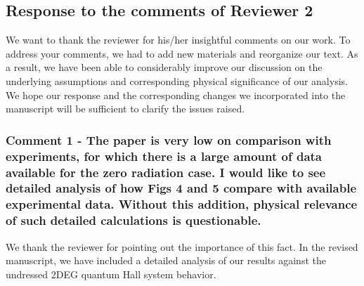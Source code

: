 \documentclass{article}
\begin{document}
\subsection*{Response to the comments of Reviewer 2}

We want to thank the reviewer for his/her insightful comments on our work. To address your comments, we had to add new materials and reorganize our text. As a result, we have been able to considerably improve our discussion on the underlying assumptions and corresponding physical significance of our analysis. We hope our response and the corresponding changes we incorporated into the manuscript will be sufficient to clarify the issues raised.


\subsubsection*{Comment 1 -
\color{RoyalBlue} The paper is very low on comparison with experiments, for which there is a large amount of data available for the zero radiation case. I would like to see detailed analysis of how Figs 4 and 5 compare with available
experimental data. Without this addition, physical relevance of such
detailed calculations is questionable.
}

We thank the reviewer for pointing out the importance of this fact. In the revised manuscript, we have included a detailed analysis of our results against the undressed 2DEG quantum Hall system behavior.
\end{document}
